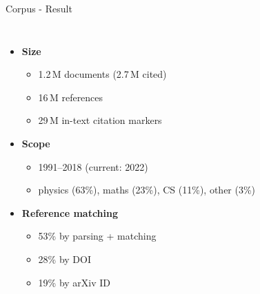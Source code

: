 \documentclass[en,16:9,smallfoot]{sdqbeamer}
\begin{document}
   \begin{frame}{Corpus - Result}
   \begin{columns}
        \begin{itemize}
            \item \textbf{Size}
            \begin{itemize}
                \item 1.2\,M documents (2.7\,M cited)
                \item 16\,M references
                \item 29\,M in-text citation markers
            \end{itemize}
            \item \textbf{Scope}
            \begin{itemize}
                \item 1991--2018 (current: 2022)
                \item physics (63\%), maths (23\%), CS (11\%), other (3\%)
            \end{itemize}
            \item \textbf{Reference matching}
            \begin{itemize}
                \item 53\% by parsing + matching
                \item 28\% by DOI
                \item 19\% by arXiv ID
            \end{itemize}
        \end{itemize}
   \end{columns}
   \end{frame}
\end{document}
